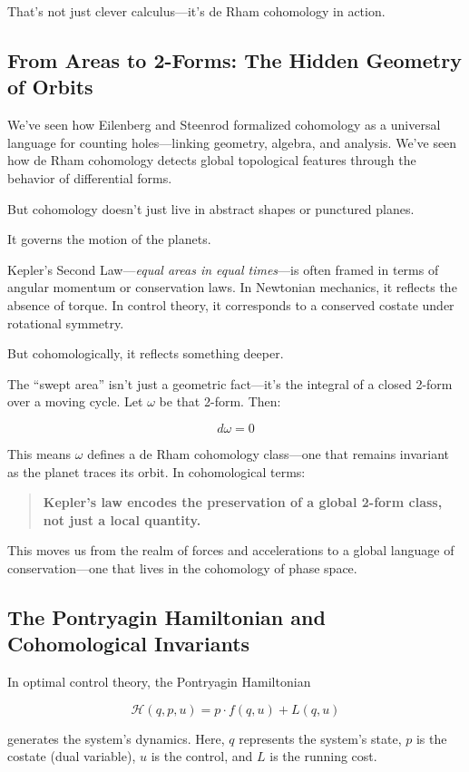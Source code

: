 That’s not just clever calculus—it’s de Rham cohomology in action.


\subsection{From Areas to 2-Forms: The Hidden Geometry of Orbits}

We’ve seen how Eilenberg and Steenrod formalized cohomology as a universal language for counting holes—linking geometry, algebra, and analysis. We’ve seen how de Rham cohomology detects global topological features through the behavior of differential forms.

But cohomology doesn’t just live in abstract shapes or punctured planes.

It governs the motion of the planets.

Kepler’s Second Law—\textit{equal areas in equal times}—is often framed in terms of angular momentum or conservation laws. In Newtonian mechanics, it reflects the absence of torque. In control theory, it corresponds to a conserved costate under rotational symmetry.

But cohomologically, it reflects something deeper.

The “swept area” isn’t just a geometric fact—it’s the integral of a closed 2-form over a moving cycle. Let \( \omega \) be that 2-form. Then:

\[
d\omega = 0
\]

This means \( \omega \) defines a de Rham cohomology class—one that remains invariant as the planet traces its orbit. In cohomological terms:

\begin{quote}
\textbf{Kepler’s law encodes the preservation of a global 2-form class, not just a local quantity.}
\end{quote}

This moves us from the realm of forces and accelerations to a global language of conservation—one that lives in the cohomology of phase space.

\subsection{The Pontryagin Hamiltonian and Cohomological Invariants}

In optimal control theory, the Pontryagin Hamiltonian

\[
\mathcal{H}(q, p, u) = p \cdot f(q, u) + L(q, u)
\]

generates the system’s dynamics. Here, \( q \) represents the system’s state, \( p \) is the costate (dual variable), \( u \) is the control, and \( L \) is the running cost.

